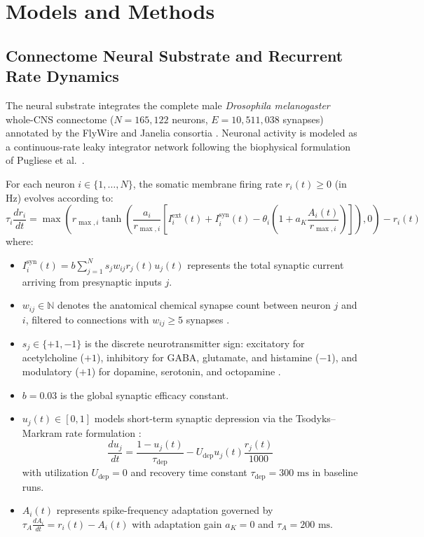 \documentclass[10pt,letterpaper]{article}
\begin{document}
\section{Models and Methods}

\subsection{Connectome Neural Substrate and Recurrent Rate Dynamics}

The neural substrate integrates the complete male \textit{Drosophila melanogaster} whole-CNS connectome ($N = 165,122$ neurons, $E = 10,511,038$ synapses) annotated by the FlyWire and Janelia consortia \cite{dorkenwald2024neuronal, schlegel2024whole}. Neuronal activity is modeled as a continuous-rate leaky integrator network following the biophysical formulation of Pugliese et al.\ \cite{pugliese2025whole}.

For each neuron $i \in \{1, \dots, N\}$, the somatic membrane firing rate $r_i(t) \ge 0$ (in Hz) evolves according to:
\begin{equation}
\tau_i \frac{dr_i}{dt} = \max\left( r_{\max,i} \tanh\left( \frac{a_i}{r_{\max,i}} \left[ I_i^{\text{ext}}(t) + I_i^{\text{syn}}(t) - \theta_i \left(1 + a_K \frac{A_i(t)}{r_{\max,i}}\right) \right] \right), 0 \right) - r_i(t)
\label{eq:rate_dynamics}
\end{equation}
where:
\begin{itemize}
    \item $I_i^{\text{syn}}(t) = b \sum_{j=1}^N s_j w_{ij} r_j(t) u_j(t)$ represents the total synaptic current arriving from presynaptic inputs $j$.
    \item $w_{ij} \in \mathbb{N}$ denotes the anatomical chemical synapse count between neuron $j$ and $i$, filtered to connections with $w_{ij} \ge 5$ synapses \cite{pugliese2025whole}.
    \item $s_j \in \{+1, -1\}$ is the discrete neurotransmitter sign: excitatory for acetylcholine ($+1$), inhibitory for GABA, glutamate, and histamine ($-1$), and modulatory ($+1$) for dopamine, serotonin, and octopamine \cite{schlegel2024whole}.
    \item $b = 0.03$ is the global synaptic efficacy constant.
    \item $u_j(t) \in [0, 1]$ models short-term synaptic depression via the Tsodyks--Markram rate formulation \cite{tsodyks1997neural}:
    \begin{equation}
    \frac{du_j}{dt} = \frac{1 - u_j(t)}{\tau_{\text{dep}}} - U_{\text{dep}} u_j(t) \frac{r_j(t)}{1000}
    \end{equation}
    with utilization $U_{\text{dep}} = 0$ and recovery time constant $\tau_{\text{dep}} = 300\text{ ms}$ in baseline runs.
    \item $A_i(t)$ represents spike-frequency adaptation governed by $\tau_A \frac{dA_i}{dt} = r_i(t) - A_i(t)$ with adaptation gain $a_K = 0$ and $\tau_A = 200\text{ ms}$.
\end{itemize}
\end{document}

